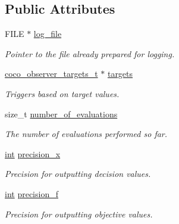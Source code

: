 \subsection*{Public Attributes}
\begin{DoxyCompactItemize}
\item 
F\+I\+LE $\ast$ \hyperlink{structlogger__toy__data__t_a1625a21808c7fbd0d8f0b73719ed9a4f}{log\+\_\+file}\hypertarget{structlogger__toy__data__t_a1625a21808c7fbd0d8f0b73719ed9a4f}{}\label{structlogger__toy__data__t_a1625a21808c7fbd0d8f0b73719ed9a4f}

\begin{DoxyCompactList}\small\item\em Pointer to the file already prepared for logging. \end{DoxyCompactList}\item 
\hyperlink{structcoco__observer__targets__t}{coco\+\_\+observer\+\_\+targets\+\_\+t} $\ast$ \hyperlink{structlogger__toy__data__t_a5a94b3de8f5a3943888f0afe68f1780f}{targets}\hypertarget{structlogger__toy__data__t_a5a94b3de8f5a3943888f0afe68f1780f}{}\label{structlogger__toy__data__t_a5a94b3de8f5a3943888f0afe68f1780f}

\begin{DoxyCompactList}\small\item\em Triggers based on target values. \end{DoxyCompactList}\item 
size\+\_\+t \hyperlink{structlogger__toy__data__t_a452dacc5a5a54c0c43bda4c72c690cbe}{number\+\_\+of\+\_\+evaluations}\hypertarget{structlogger__toy__data__t_a452dacc5a5a54c0c43bda4c72c690cbe}{}\label{structlogger__toy__data__t_a452dacc5a5a54c0c43bda4c72c690cbe}

\begin{DoxyCompactList}\small\item\em The number of evaluations performed so far. \end{DoxyCompactList}\item 
\hyperlink{classint}{int} \hyperlink{structlogger__toy__data__t_af55893a7fe9e476de2afa2f7f83b7e19}{precision\+\_\+x}\hypertarget{structlogger__toy__data__t_af55893a7fe9e476de2afa2f7f83b7e19}{}\label{structlogger__toy__data__t_af55893a7fe9e476de2afa2f7f83b7e19}

\begin{DoxyCompactList}\small\item\em Precision for outputting decision values. \end{DoxyCompactList}\item 
\hyperlink{classint}{int} \hyperlink{structlogger__toy__data__t_a552e9e407fa5ef44222e7f46af7c394a}{precision\+\_\+f}\hypertarget{structlogger__toy__data__t_a552e9e407fa5ef44222e7f46af7c394a}{}\label{structlogger__toy__data__t_a552e9e407fa5ef44222e7f46af7c394a}

\begin{DoxyCompactList}\small\item\em Precision for outputting objective values. \end{DoxyCompactList}\end{DoxyCompactItemize}



